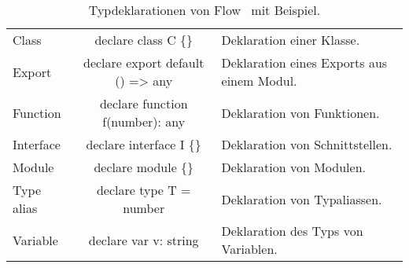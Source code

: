 \begin{longtabuenv}
\begin{longtabu} to 
    \midrule
     &  &  \\
    \midrule
  \endhead
    \midrule
    \caption{Typdeklarationen von Flow~\autocite{FLOW:LIBRARY_DEFINITIONS} mit Beispiel.}
  \endfoot
  Class       & declare class C \{\}               & Deklaration einer Klasse. \medskip\\
  Export      & declare export default () => any   & Deklaration eines Exports aus einem Modul. \medskip\\
  Function    & declare function f(number): any    & Deklaration von Funktionen. \medskip\\
  Interface   & declare interface I \{\}           & Deklaration von Schnittstellen. \medskip\\
  Module      & declare module  \{\} & Deklaration von Modulen. \medskip\\
  Type alias  & declare type T = number            & Deklaration von Typaliassen. \medskip\\
  Variable    & declare var v: string              & Deklaration des Typs von Variablen. \medskip
  \label{tab:flow-type-declarations}
\end{longtabu}
\end{longtabuenv}
